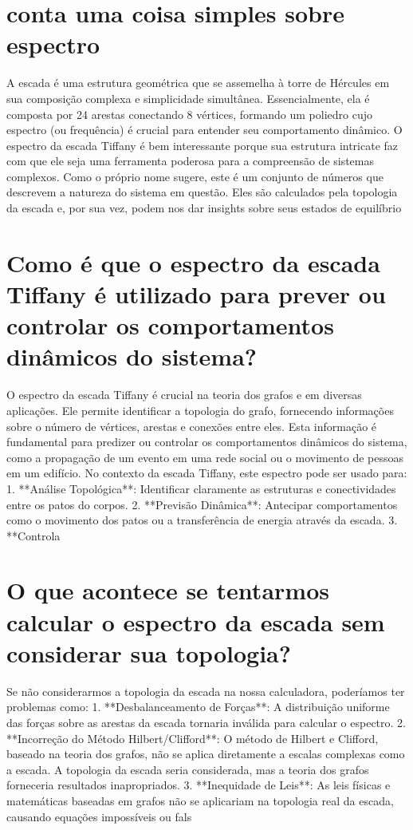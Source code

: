 \documentclass[11pt,a4paper]{article}
\begin{document}
\section{conta uma coisa simples sobre espectro}
A escada é uma estrutura geométrica que se assemelha à torre de Hércules em sua composição complexa e simplicidade simultânea. Essencialmente, ela é composta por 24 arestas conectando 8 vértices, formando um poliedro cujo espectro (ou frequência) é crucial para entender seu comportamento dinâmico. O espectro da escada Tiffany é bem interessante porque sua estrutura intricate faz com que ele seja uma ferramenta poderosa para a compreensão de sistemas complexos. Como o próprio nome sugere, este é um conjunto de números que descrevem a natureza do sistema em questão. Eles são calculados pela topologia da escada e, por sua vez, podem nos dar insights sobre seus estados de equilíbrio

\section{Como é que o espectro da escada Tiffany é utilizado para prever ou controlar os comportamentos dinâmicos do sistema?}
O espectro da escada Tiffany é crucial na teoria dos grafos e em diversas aplicações. Ele permite identificar a topologia do grafo, fornecendo informações sobre o número de vértices, arestas e conexões entre eles. Esta informação é fundamental para predizer ou controlar os comportamentos dinâmicos do sistema, como a propagação de um evento em uma rede social ou o movimento de pessoas em um edifício. No contexto da escada Tiffany, este espectro pode ser usado para: 1. **Análise Topológica**: Identificar claramente as estruturas e conectividades entre os patos do corpos. 2. **Previsão Dinâmica**: Antecipar comportamentos como o movimento dos patos ou a transferência de energia através da escada. 3. **Controla

\section{O que acontece se tentarmos calcular o espectro da escada sem considerar sua topologia?}
Se não considerarmos a topologia da escada na nossa calculadora, poderíamos ter problemas como: 1. **Desbalanceamento de Forças**: A distribuição uniforme das forças sobre as arestas da escada tornaria inválida para calcular o espectro. 2. **Incorreção do Método Hilbert/Clifford**: O método de Hilbert e Clifford, baseado na teoria dos grafos, não se aplica diretamente a escalas complexas como a escada. A topologia da escada seria considerada, mas a teoria dos grafos forneceria resultados inapropriados. 3. **Inequidade de Leis**: As leis físicas e matemáticas baseadas em grafos não se aplicariam na topologia real da escada, causando equações impossíveis ou fals
\end{document}
